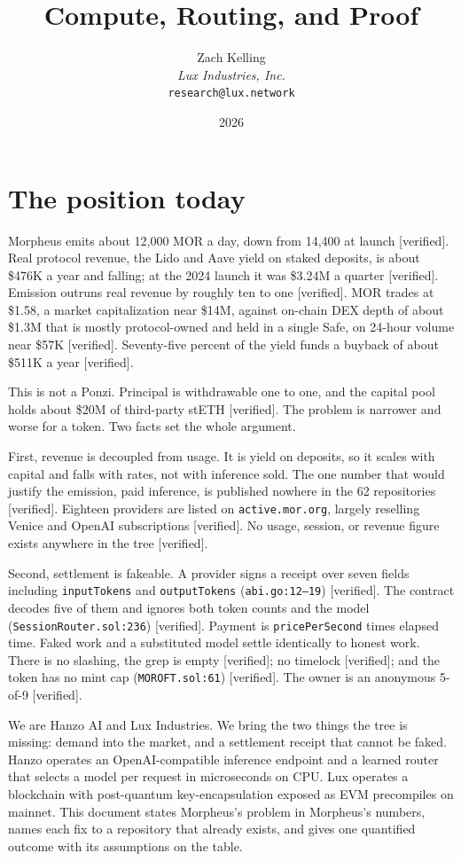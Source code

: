\documentclass[11pt,a4paper]{article}
\title{Compute, Routing, and Proof}\author{Zach Kelling\\\textit{Lux Industries, Inc.}\\\texttt{research@lux.network}}\date{2026}
\newcommand{\code}[1]{\texttt{\small #1}}
\begin{document}
\luxcoverpage

\tableofcontents
\clearpage

\section{The position today}

Morpheus emits about 12{,}000 MOR a day, down from 14{,}400 at launch [verified]. Real protocol revenue, the Lido
and Aave yield on staked deposits, is about \$476K a year and falling; at the
2024 launch it was \$3.24M a quarter [verified]. Emission outruns real revenue
by roughly ten to one [verified]. MOR trades at \$1.58, a market capitalization
near \$14M, against on-chain DEX depth of about \$1.3M that is mostly
protocol-owned and held in a single Safe, on 24-hour volume near \$57K
[verified]. Seventy-five percent of the yield funds a buyback of about \$511K a
year [verified].

This is not a Ponzi. Principal is withdrawable one to one, and the capital pool
holds about \$20M of third-party stETH [verified]. The problem is narrower and
worse for a token. Two facts set the whole argument.

First, revenue is decoupled from usage. It is yield on deposits, so it scales
with capital and falls with rates, not with inference sold. The one number that
would justify the emission, paid inference, is published nowhere in the 62
repositories [verified]. Eighteen providers are listed on \code{active.mor.org},
largely reselling Venice and OpenAI subscriptions [verified]. No usage, session,
or revenue figure exists anywhere in the tree [verified].

Second, settlement is fakeable. A provider signs a receipt over seven fields
including \code{inputTokens} and \code{outputTokens} (\code{abi.go:12--19})
[verified]. The contract decodes five of them and ignores both token counts and
the model (\code{SessionRouter.sol:236}) [verified]. Payment is
\code{pricePerSecond} times elapsed time. Faked work and a substituted model
settle identically to honest work. There is no slashing, the grep is empty
[verified]; no timelock [verified]; and the token has no mint cap
(\code{MOROFT.sol:61}) [verified]. The owner is an anonymous 5-of-9 [verified].

We are Hanzo AI and Lux Industries. We bring the two things the tree is missing:
demand into the market, and a settlement receipt that cannot be faked. Hanzo
operates an OpenAI-compatible inference endpoint and a learned router that selects
a model per request in microseconds on CPU. Lux operates a blockchain with
post-quantum key-encapsulation exposed as EVM precompiles on mainnet. This
document states Morpheus's problem in Morpheus's numbers, names each fix to a
repository that already exists, and gives one quantified outcome with its
assumptions on the table.
\end{document}

